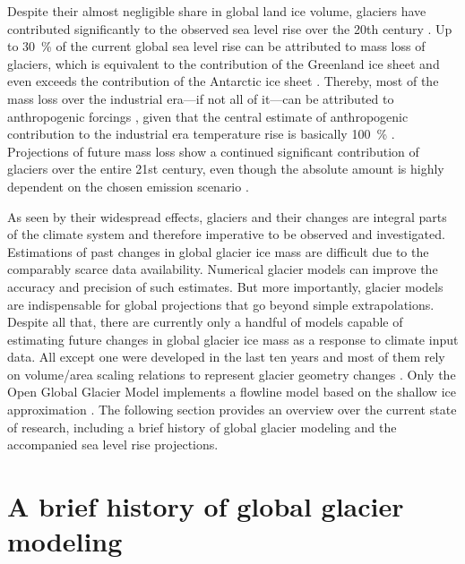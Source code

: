     Despite their almost negligible share in global land ice volume, glaciers have contributed significantly to the observed sea level rise over the 20th century \citep[e.g.,][]{Marzeion2015, Bamber_2018}. Up to \SI{30}{\percent} of the current global sea level rise can be attributed to mass loss of glaciers, which is equivalent to the contribution of the Greenland ice sheet and even exceeds the contribution of the Antarctic ice sheet \citep{Zemp2019}. Thereby, most of the mass loss over the industrial era---if not all of it---can be attributed to anthropogenic forcings \citep{Marzeion2014a, Roe2020}, given that the central estimate of anthropogenic contribution to the industrial era temperature rise is basically \SI{100}{\percent} \citep{Allen2018}. Projections of future mass loss show a continued significant contribution of glaciers over the entire 21st century, even though the absolute amount is highly dependent on the chosen emission scenario \citep{Hock2019a, Marzeion2020}.

    As seen by their widespread effects, glaciers and their changes are integral parts of the climate system and therefore imperative to be observed and investigated. Estimations of past changes in global glacier ice mass are difficult due to the comparably scarce data availability. Numerical glacier models can improve the accuracy and precision of such estimates. But more importantly, glacier models are indispensable for global projections that go beyond simple extrapolations. Despite all that, there are currently only a handful of models capable of estimating future changes in global glacier ice mass as a response to climate input data. All except one were developed in the last ten years and most of them rely on volume/area scaling relations to represent glacier geometry changes \citep[e.g.,][]{VanDeWal2001,Marzeion2012b,Radic2014a}. Only the Open Global Glacier Model \citep[OGGM,][]{Maussion2019} implements a flowline model based on the shallow ice approximation \citep[SIA e.g.,][]{Hutter1983}. The following section provides an overview over the current state of research, including a brief history of global glacier modeling and the accompanied sea level rise projections.



\section{A brief history of global glacier modeling} %
\label{sec:history_of_glacier_modeling}
    
